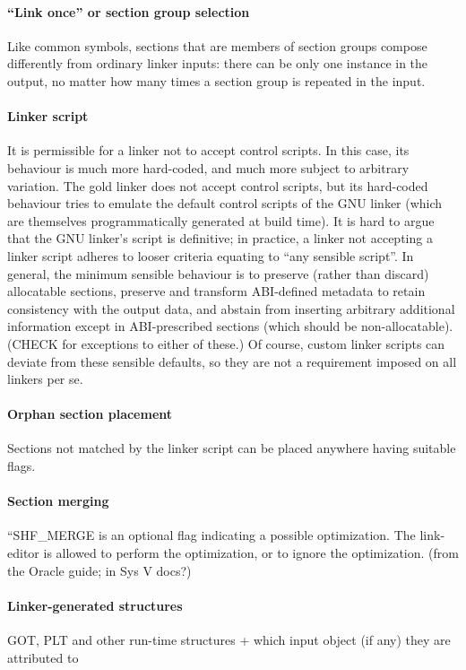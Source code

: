 \paragraph{``Link once'' or section group selection}
Like common symbols, 
sections that are members of section groups compose differently
from ordinary linker inputs:
there can be only one instance in the output, no matter how many times
a section group is repeated in the input.

\paragraph{Linker script}
It is permissible for a linker not to accept control scripts.
In this case, its behaviour is much more hard-coded,
and much more subject to arbitrary variation.
The \textsf{gold} linker does not accept control scripts, 
but its hard-coded behaviour tries to emulate the default control scripts of the GNU linker
(which are themselves programmatically generated at build time).
It is hard to argue that the GNU linker's script is definitive; 
in practice, a linker not accepting a linker script
adheres to looser criteria equating to ``any sensible script''.
In general, the minimum sensible 
behaviour is to preserve (rather than discard) allocatable sections, 
preserve and transform ABI-defined metadata to retain consistency with the output data,
and abstain from inserting arbitrary additional information
except in ABI-prescribed sections (which should be non-allocatable).  (CHECK for exceptions to either of these.)
Of course, custom linker scripts can deviate from these sensible defaults,
so they are not a requirement imposed on all linkers per se.

\paragraph{Orphan section placement}
Sections not matched by the linker script can be placed anywhere
having suitable flags.

\paragraph{Section merging}
``SHF\_MERGE is an optional flag indicating a possible optimization. The link-editor is allowed to perform the optimization, or to ignore the optimization. 
(from the Oracle guide; in Sys V docs?)

\paragraph{Linker-generated structures}
GOT, PLT and other run-time structures + which input object (if any) they are attributed to

